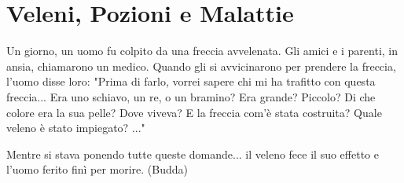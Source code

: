 \section{Veleni, Pozioni e Malattie}

\label{veleni-e-pozioni}

\begin{changemargin}{0.3cm}{0.3cm}\begin{enfasi}{
Un giorno, un uomo fu colpito da una freccia avvelenata. Gli amici e i parenti, in ansia, chiamarono un medico. Quando gli si avvicinarono per prendere la freccia, l'uomo disse loro: "Prima di farlo, vorrei sapere chi mi ha trafitto con questa freccia... Era uno schiavo, un re, o un bramino? Era grande? Piccolo? Di che colore era la sua pelle? Dove viveva? E la freccia com'è stata costruita? Quale veleno è stato impiegato? ..."

Mentre si stava ponendo tutte queste domande... il veleno fece il suo effetto e l'uomo ferito finì per morire. (Budda)}\end{enfasi}\end{changemargin}\medskip

